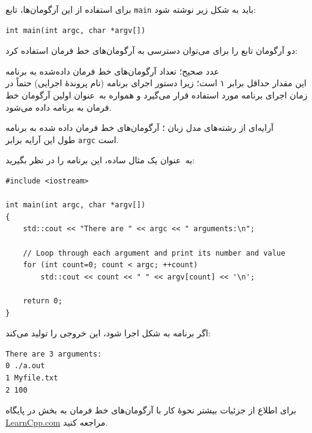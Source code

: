\documentclass{utap}
\renewcommand{\labelitemi}{$\circ$}
\begin{document}
    برای استفاده از این آرگومان‌ها، تابع \lstinline{main} باید به شکل زیر نوشته شود:
    \begin{latin}\begin{lstlisting}
int main(int argc, char *argv[])
    \end{lstlisting}\end{latin}

    دو آرگومان تابع  را برای می‌توان دسترسی به آرگومان‌های خط فرمان استفاده کرد:
    \begin{description}[leftmargin=5em,style=nextline,font=\labelitemi\quad\bfseries]
        \item[\lr{\texttt{argc}}] عدد صحیح؛ تعداد آرگومان‌های خط فرمان داده‌شده به برنامه\\
        این مقدار حداقل برابر ۱ است؛ زیرا دستور اجرای برنامه (نام پروندهٔ اجرایی) حتماً در زمان اجرای برنامه مورد استفاده قرار می‌گیرد و همواره به~عنوان اولین آرگومان خط فرمان به برنامه داده می‌شود.
        \item[\lr{\texttt{argv}}] آرایه‌ای از رشته‌های مدل زبان ؛ آرگومان‌های خط فرمان داده شده به برنامه\\
        طول این آرایه برابر \lstinline{argc} است.
    \end{description}

    به~عنوان یک مثال ساده، این برنامه را در نظر بگیرید:
    \begin{latin}\begin{lstlisting}
#include <iostream>
 
int main(int argc, char *argv[])
{
    std::cout << "There are " << argc << " arguments:\n";
 
    // Loop through each argument and print its number and value
    for (int count=0; count < argc; ++count)
        std::cout << count << " " << argv[count] << '\n';
 
    return 0;
}

    \end{lstlisting}\end{latin}

    اگر برنامه به شکل  اجرا شود، این خروجی را تولید می‌کند:
    \begin{latin}%
    \begin{Verbatim}[fontsize=\small]
There are 3 arguments:
0 ./a.out
1 Myfile.txt
2 100
    \end{Verbatim}
    \end{latin}

    برای اطلاع از جزئیات بیشتر نحوهٔ کار با آرگومان‌های خط فرمان به بخش \href{https://www.learncpp.com/cpp-tutorial/713-command-line-arguments/}{} در پایگاه \url{LearnCpp.com} مراجعه کنید.
\end{document}
